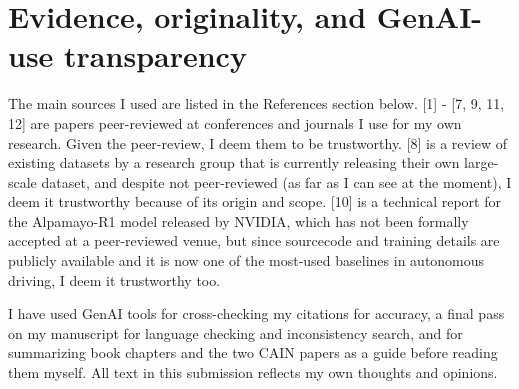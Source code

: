 \documentclass[11pt]{article}
\begin{document}
\section{Evidence, originality, and GenAI-use transparency}
The main sources I used are listed in the References section below. [1] - [7, 9, 11, 12] are papers peer-reviewed at conferences and journals I use for my own research. Given the peer-review, I deem them to be trustworthy. [8] is a review of existing datasets by a research group that is currently releasing their own large-scale dataset, and despite not peer-reviewed (as far as I can see at the moment), I deem it trustworthy because of its origin and scope. [10] is a technical report for the Alpamayo-R1 model released by NVIDIA, which has not been formally accepted at a peer-reviewed venue, but since sourcecode and training details are publicly available and it is now one of the most-used baselines in autonomous driving, I deem it trustworthy too. 

I have used GenAI tools for cross-checking my citations for accuracy, a final pass on my manuscript for language checking and inconsistency search, and for summarizing book chapters and the two CAIN papers as a guide before reading them myself. All text in this submission reflects my own thoughts and opinions.
\end{document}
